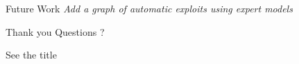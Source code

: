 \documentclass{beamer}
\begin{document}
\begin{frame}{Future Work}
\textit{Add a graph of automatic exploits using expert models}
\end{frame}

\begin{frame}{Thank you Questions ?}

See the title

\end{frame}
\end{document}

